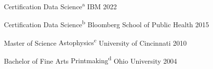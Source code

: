

\begin{cvcertificates}

  \cvcertificate
    {Certification}
    {Data Science\textsuperscript{a}}
    {IBM} %
    {2022} %

  \cvcertificate
    {Certification}
    {Data Science\textsuperscript{b}}
    {Bloomberg School of Public Health} %
    {2015} %

  \cvcertificate
    {Master of Science}
    {Astophysics\textsuperscript{c}}
    {University of Cincinnati} %
    {2010} %

\cvcertificate
  {Bachelor of Fine Arts} %
  {Printmaking\textsuperscript{d}}
  {Ohio University} %
  {2004} %

\end{cvcertificates}
